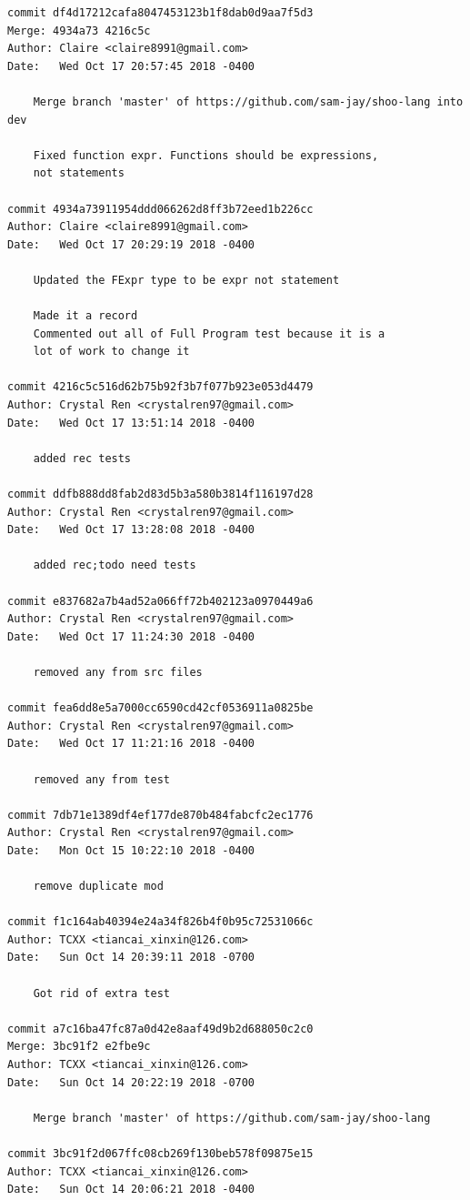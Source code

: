 \documentclass[12pt]{article}
\begin{document}
\begin{lstlisting}
commit df4d17212cafa8047453123b1f8dab0d9aa7f5d3
Merge: 4934a73 4216c5c
Author: Claire <claire8991@gmail.com>
Date:   Wed Oct 17 20:57:45 2018 -0400

    Merge branch 'master' of https://github.com/sam-jay/shoo-lang into dev
    
    Fixed function expr. Functions should be expressions,
    not statements

commit 4934a73911954ddd066262d8ff3b72eed1b226cc
Author: Claire <claire8991@gmail.com>
Date:   Wed Oct 17 20:29:19 2018 -0400

    Updated the FExpr type to be expr not statement
    
    Made it a record
    Commented out all of Full Program test because it is a
    lot of work to change it

commit 4216c5c516d62b75b92f3b7f077b923e053d4479
Author: Crystal Ren <crystalren97@gmail.com>
Date:   Wed Oct 17 13:51:14 2018 -0400

    added rec tests

commit ddfb888dd8fab2d83d5b3a580b3814f116197d28
Author: Crystal Ren <crystalren97@gmail.com>
Date:   Wed Oct 17 13:28:08 2018 -0400

    added rec;todo need tests

commit e837682a7b4ad52a066ff72b402123a0970449a6
Author: Crystal Ren <crystalren97@gmail.com>
Date:   Wed Oct 17 11:24:30 2018 -0400

    removed any from src files

commit fea6dd8e5a7000cc6590cd42cf0536911a0825be
Author: Crystal Ren <crystalren97@gmail.com>
Date:   Wed Oct 17 11:21:16 2018 -0400

    removed any from test

commit 7db71e1389df4ef177de870b484fabcfc2ec1776
Author: Crystal Ren <crystalren97@gmail.com>
Date:   Mon Oct 15 10:22:10 2018 -0400

    remove duplicate mod

commit f1c164ab40394e24a34f826b4f0b95c72531066c
Author: TCXX <tiancai_xinxin@126.com>
Date:   Sun Oct 14 20:39:11 2018 -0700

    Got rid of extra test

commit a7c16ba47fc87a0d42e8aaf49d9b2d688050c2c0
Merge: 3bc91f2 e2fbe9c
Author: TCXX <tiancai_xinxin@126.com>
Date:   Sun Oct 14 20:22:19 2018 -0700

    Merge branch 'master' of https://github.com/sam-jay/shoo-lang

commit 3bc91f2d067ffc08cb269f130beb578f09875e15
Author: TCXX <tiancai_xinxin@126.com>
Date:   Sun Oct 14 20:06:21 2018 -0400


\end{lstlisting}
\end{document}
